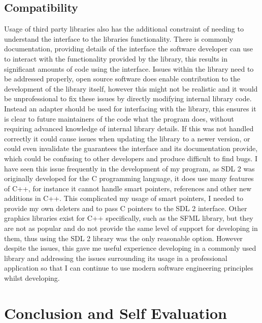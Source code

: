 \documentclass[]{final_report}
\begin{document}
\section*{Compatibility}

Usage of third party libraries also has the additional constraint of needing to understand the interface to the libraries functionality. There is commonly documentation, providing details of the interface the software developer can use to interact with the functionality provided by the library, this results in significant amounts of code using the interface. Issues within the library need to be addressed properly, open source software does enable contribution to the development of the library itself, however this might not be realistic and it would be unprofessional to fix these issues by directly modifying internal library code. Instead an adapter should be used for interfacing with the library, this ensures it is clear to future maintainers of the code what the program does, without requiring advanced knowledge of internal library details. If this was not handled correctly it could cause issues when updating the library to a newer version, or could even invalidate the guarantees the interface and its documentation provide, which could be confusing to other developers and produce difficult to find bugs. I have seen this issue frequently in the development of my program, as SDL 2 was originally developed for the C programming language, it does use many features of C++, for instance it cannot handle smart pointers, references and other new additions in C++. This complicated my usage of smart pointers, I needed to provide my own deleters and to pass C pointers to the SDL 2 interface. Other graphics libraries exist for C++ specifically, such as the SFML library, but they are not as popular and do not provide the same level of support for developing in them, thus using the SDL 2 library was the only reasonable option. However despite the issues, this gave me useful experience developing in a commonly used library and addressing the issues surrounding its usage in a professional application so that I can continue to use modern software engineering principles whilst developing.

\chapter*{Conclusion and Self Evaluation}
\end{document}

